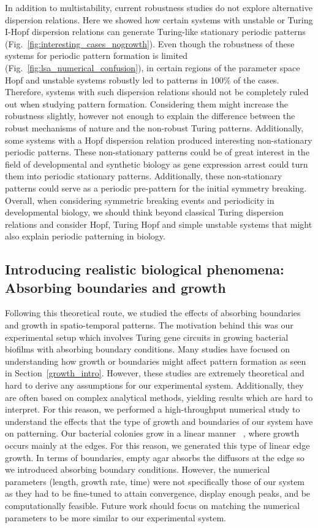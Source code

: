 In addition to multistability, current robustness studies do not explore alternative dispersion relations.
Here we showed how certain systems with unstable or Turing I-Hopf dispersion relations can generate Turing-like stationary periodic patterns (Fig.~\ref{fig:interesting_cases_nogrowth}).
Even though the robustness of these systems for periodic pattern formation is limited (Fig.~\ref{fig:lsa_numerical_confusion}), in certain regions of the parameter space Hopf and unstable systems robustly led to patterns in 100\% of the cases.
Therefore, systems with such dispersion relations should not be completely ruled out when studying pattern formation.
Considering them might increase the robustness slightly, however not enough to explain the difference between the robust mechanisms of nature and the non-robust Turing patterns.
Additionally, some systems with a Hopf dispersion relation produced interesting non-stationary periodic patterns.
These non-stationary patterns could be of great interest in the field of developmental and synthetic biology as gene expression arrest could turn them into periodic stationary patterns.
Additionally, these non-stationary patterns could serve as a periodic pre-pattern for the initial symmetry breaking.
Overall, when considering symmetric breaking events and periodicity in developmental biology, we should think beyond classical Turing dispersion relations and consider Hopf, Turing Hopf and simple unstable systems that might also explain periodic patterning in biology.

\subsection*{Introducing realistic biological phenomena: Absorbing boundaries and growth}
Following this theoretical route, we studied the effects of absorbing boundaries and growth in spatio-temporal patterns.
The motivation behind this was our experimental setup which involves Turing gene circuits in growing bacterial biofilms with absorbing boundary conditions.
Many studies have focused on understanding how growth or boundaries might affect pattern formation as seen in Section~\ref{growth_intro}.
However, these studies are extremely theoretical and hard to derive any assumptions for our experimental system.
Additionally, they are often based on complex analytical methods, yielding results which are hard to interpret.
For this reason, we performed a high-throughput numerical study to understand the effects that the type of growth and boundaries of our system have on patterning.
Our bacterial colonies grow in a linear manner ~\cite{Tica2023}, where growth occurs mainly at the edges.
For this reason, we generated this type of linear edge growth.
In terms of boundaries, empty agar absorbs the diffusors at the edge so we introduced absorbing boundary conditions.
However, the numerical parameters (length, growth rate, time) were not specifically those of our system as they had to be fine-tuned to attain convergence, display enough peaks, and be computationally feasible.
Future work should focus on matching the numerical parameters to be more similar to our experimental system.

